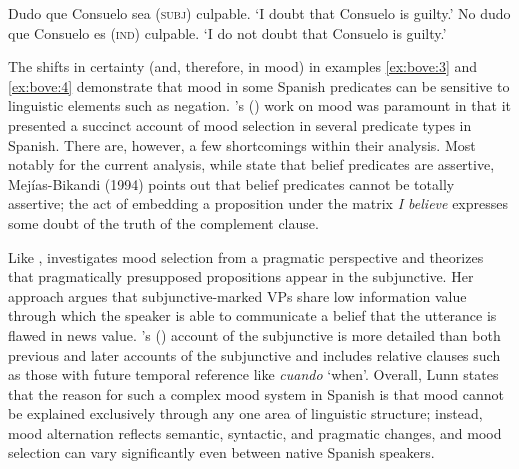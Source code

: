 \documentclass[output=paper,colorlinks,citecolor=brown,
]{langscibook}
\begin{document}
\begin{exe} %
    \ex\label{ex:bove:4} 
    \begin{xlist} %
        \ex \label{ex:bove:4a}
            Dudo que Consuelo sea (\textsc{subj}) culpable.  %
                   \glt `I doubt that Consuelo is guilty.'
        \ex\label{ex:bove:4b}
            No dudo que Consuelo es (\textsc{ind}) culpable.
                   \glt `I do not doubt that Consuelo is guilty.'
\end{xlist}
\end{exe}


The shifts in certainty (and, therefore, in mood) in examples \ref{ex:bove:3} and \ref{ex:bove:4} demonstrate that mood in some Spanish predicates can be sensitive to linguistic elements such as negation. \citeauthor{TerrellHooper1974}'s (\citeyear{TerrellHooper1974}) work on mood was paramount in that it presented a succinct account of mood selection in several predicate types in Spanish. There are, however, a few shortcomings within their analysis. Most notably for the current analysis, while \citeauthor{TerrellHooper1974} state that belief predicates are assertive, Mejías-Bikandi (1994) points out that belief predicates cannot be totally assertive; the act of embedding a proposition under the matrix \textit{I believe} expresses some doubt of the truth of the complement clause. 




Like \citet{TerrellHooper1974}, \citet{Lunn1989} investigates mood selection from a pragmatic perspective and theorizes that pragmatically presupposed propositions appear in the subjunctive. Her approach argues that subjunctive-marked VPs share low information value through which the speaker is able to communicate a belief that the utterance is flawed in news value. \citeauthor{Lunn1995}'s (\citeyear{Lunn1995}) account of the subjunctive is more detailed than both previous and later accounts of the subjunctive and includes relative clauses such as those with future temporal reference like \textit{cuando} `when'. Overall, Lunn states that the reason for such a complex mood system in Spanish is that mood cannot be explained exclusively through any one area of linguistic structure; instead, mood alternation reflects semantic, syntactic, and pragmatic changes, and mood selection can vary significantly even between native Spanish speakers.
\end{document}
